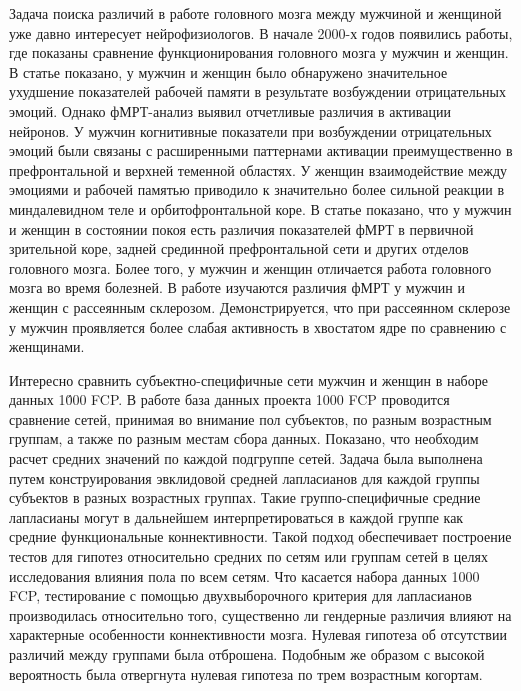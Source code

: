 Задача поиска различий в работе головного мозга между мужчиной и женщиной уже давно интересует нейрофизиологов. 
В начале 2000-х годов появились работы, где показаны сравнение функционирования головного мозга у мужчин и женщин. 
В статье \cite{koch2007gender} показано, у мужчин и женщин было обнаружено значительное ухудшение показателей 
рабочей памяти в результате возбуждении отрицательных эмоций. Однако фМРТ-анализ выявил отчетливые различия в 
активации нейронов. У мужчин когнитивные показатели при возбуждении отрицательных эмоций были связаны 
с расширенными паттернами активации преимущественно в префронтальной и верхней теменной областях. 
У женщин взаимодействие между эмоциями и рабочей памятью приводило к значительно более сильной реакции 
в миндалевидном теле и орбитофронтальной коре. В статье \cite{xu2015gender} показано, что у мужчин и женщин 
в состоянии покоя есть различия показателей фМРТ в первичной зрительной коре, задней срединной префронтальной 
сети и других отделов головного мозга. Более того, у мужчин и женщин отличается работа головного мозга во время 
болезней. В работе \cite{zang2004regional} изучаются различия фМРТ у мужчин и женщин с рассеянным склерозом. 
Демонстрируется, что при рассеянном склерозе у мужчин проявляется 
более слабая активность в хвостатом ядре по сравнению с женщинами.

Интересно сравнить субъектно-специфичные сети мужчин и женщин в наборе данных 1\'000 FCP. В работе 
\cite{ginestet2017hypothesis} база данных проекта 1000 FCP проводится сравнение сетей, принимая во внимание 
пол субъектов, по разным возрастным группам, а также по разным местам сбора данных. Показано, 
что необходим расчет средних значений по каждой подгруппе сетей. Задача была выполнена путем 
конструирования эвклидовой средней лапласианов для каждой группы субъектов в разных возрастных группах. 
Такие группо-специфичные средние лапласианы могут в дальнейшем интерпретироваться в каждой группе 
как средние функциональные коннективности. Такой подход обеспечивает построение тестов для гипотез 
относительно средних по сетям или группам сетей в целях исследования влияния пола по всем сетям. 
Что касается набора данных 1000 FCP, тестирование с помощью двухвыборочного критерия для лапласианов 
производилась относительно того, существенно ли гендерные различия влияют на характерные особенности 
коннективности мозга. Нулевая гипотеза об отсутствии различий между группами была отброшена. 
Подобным же образом с высокой вероятность была отвергнута нулевая гипотеза по трем возрастным когортам.

